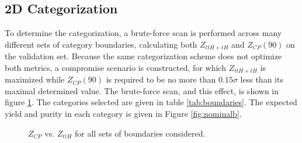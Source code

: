 \subsection{2D Categorization}

To determine the categorization, a brute-force scan is performed across many different sets of category boundaries, calculating both $Z_{ttH+tH}$ and $Z_{CP}(90)$ on the validation set. Because the same categorization scheme does not optimize both metrics, a compromise scenario is constructed, for which $Z_{ttH+tH}$ is maximized while $Z_{CP}(90)$ is required to be no more than $0.15\sigma$ less than its maximal determined value. The brute-force scan, and this effect, is shown in figure \ref{fig:optimal}. The categories selected are given in table \ref{tab:boundaries}. The expected yield and purity in each category is given in Figure \ref{fig:nominalb}.

\begin{figure}[htbp]
 \centering
  \caption{$Z_{CP}$ vs. $Z_{ttH}$ for all sets of boundaries considered.}
  \label{fig:optimal}
\end{figure}

